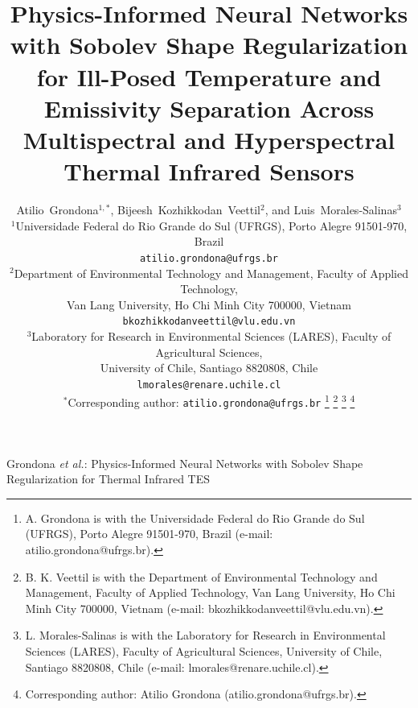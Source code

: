 \documentclass[journal]{IEEEtran}
\begin{document}
\title{Physics-Informed Neural Networks with Sobolev Shape Regularization for Ill-Posed Temperature and Emissivity Separation Across Multispectral and Hyperspectral Thermal Infrared Sensors}

\author{Atilio~Grondona$^{1,*}$, \quad Bijeesh~Kozhikkodan~Veettil$^{2}$, \quad and \quad Luis~Morales-Salinas$^{3}$\\[0.5em]
\normalsize $^{1}$Universidade Federal do Rio Grande do Sul (UFRGS), Porto Alegre 91501-970, Brazil\\
\small \texttt{atilio.grondona@ufrgs.br}\\[0.3em]
\normalsize $^{2}$Department of Environmental Technology and Management, Faculty of Applied Technology,\\
\normalsize Van Lang University, Ho Chi Minh City 700000, Vietnam\\
\small \texttt{bkozhikkodanveettil@vlu.edu.vn}\\[0.3em]
\normalsize $^{3}$Laboratory for Research in Environmental Sciences (LARES), Faculty of Agricultural Sciences,\\
\normalsize University of Chile, Santiago 8820808, Chile\\
\small \texttt{lmorales@renare.uchile.cl}\\[0.4em]
\small $^{*}$Corresponding author: \texttt{atilio.grondona@ufrgs.br}%
\thanks{A. Grondona is with the Universidade Federal do Rio Grande do Sul (UFRGS), Porto Alegre 91501-970, Brazil (e-mail: atilio.grondona@ufrgs.br).}%
\thanks{B. K. Veettil is with the Department of Environmental Technology and Management, Faculty of Applied Technology, Van Lang University, Ho Chi Minh City 700000, Vietnam (e-mail: bkozhikkodanveettil@vlu.edu.vn).}%
\thanks{L. Morales-Salinas is with the Laboratory for Research in Environmental Sciences (LARES), Faculty of Agricultural Sciences, University of Chile, Santiago 8820808, Chile (e-mail: lmorales@renare.uchile.cl).}%
\thanks{Corresponding author: Atilio Grondona (atilio.grondona@ufrgs.br).}}

%
{Grondona \MakeLowercase{\textit{et al.}}: Physics-Informed Neural Networks with Sobolev Shape Regularization for Thermal Infrared TES}

\maketitle
\end{document}
